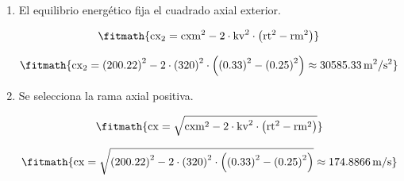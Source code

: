 \begin{enumerate}

\item El equilibrio energético fija el cuadrado axial exterior.

\[\fitmath{\mathrm{cx}_{2}={\mathrm{cxm}}^{2}-2\cdot {\mathrm{kv}}^{2}\cdot \left({\mathrm{rt}}^{2}-{\mathrm{rm}}^{2}\right)}\]

\[\fitmath{\mathrm{cx}_{2}={(200.22)}^{2}-2\cdot {(320)}^{2}\cdot \left({(0.33)}^{2}-{(0.25)}^{2}\right)\approx 30585.33\,\mathrm{m^{2}/s^{2}}}\]

\item Se selecciona la rama axial positiva.

\[\fitmath{\mathrm{cx}=\sqrt{{\mathrm{cxm}}^{2}-2\cdot {\mathrm{kv}}^{2}\cdot \left({\mathrm{rt}}^{2}-{\mathrm{rm}}^{2}\right)}}\]

\[\fitmath{\mathrm{cx}=\sqrt{{(200.22)}^{2}-2\cdot {(320)}^{2}\cdot \left({(0.33)}^{2}-{(0.25)}^{2}\right)}\approx 174.8866\,\mathrm{m/s}}\]

\end{enumerate}
